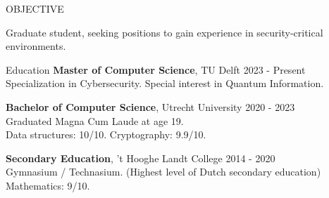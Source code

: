 \documentclass{resume} %
\begin{document}

\begin{rSection}{OBJECTIVE}

{Graduate student, seeking positions to gain experience in security-critical environments.}


\end{rSection}

\begin{rSection}{Education}
{\bf Master of Computer Science}, TU Delft \hfill {2023 - Present}\\
Specialization in Cybersecurity. Special interest in Quantum Information.

{\bf Bachelor of Computer Science}, Utrecht University \hfill {2020 - 2023}\\
Graduated Magna Cum Laude at age 19.\\
Data structures: 10/10. Cryptography: 9.9/10.

{\bf Secondary Education}, 't Hooghe Landt College \hfill {2014 - 2020}\\
Gymnasium / Technasium. (Highest level of Dutch secondary education)\\
Mathematics: 9/10.


\end{rSection}
\end{document}
